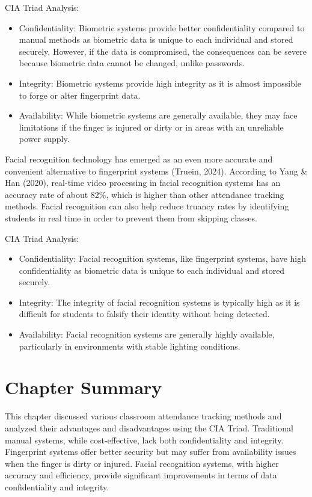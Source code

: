 CIA Triad Analysis:

\begin{itemize}
	\item Confidentiality: Biometric systems provide better confidentiality compared to manual methods as biometric data is unique to each individual and stored securely. However, if the data is compromised, the consequences can be severe because biometric data cannot be changed, unlike passwords.
	\item Integrity: Biometric systems provide high integrity as it is almost impossible to forge or alter fingerprint data.
	\item Availability: While biometric systems are generally available, they may face limitations if the finger is injured or dirty or in areas with an unreliable power supply.
\end{itemize}

Facial recognition technology has emerged as an even more accurate and convenient alternative to fingerprint systems (Truein, 2024). According to Yang \& Han (2020), real-time video processing in facial recognition systems has an accuracy rate of about 82\%, which is higher than other attendance tracking methods. Facial recognition can also help reduce truancy rates by identifying students in real time in order to prevent them from skipping classes.

CIA Triad Analysis:

\begin{itemize}
	\item Confidentiality: Facial recognition systems, like fingerprint systems, have high confidentiality as biometric data is unique to each individual and stored securely.
	\item Integrity: The integrity of facial recognition systems is typically high as it is difficult for students to falsify their identity without being detected.
	\item Availability: Facial recognition systems are generally highly available, particularly in environments with stable lighting conditions.
\end{itemize}

\section{Chapter Summary}

This chapter discussed various classroom attendance tracking methods and analyzed their advantages and disadvantages using the CIA Triad. Traditional manual systems, while cost-effective, lack both confidentiality and integrity. Fingerprint systems offer better security but may suffer from availability issues when the finger is dirty or injured. Facial recognition systems, with higher accuracy and efficiency, provide significant improvements in terms of data confidentiality and integrity.


